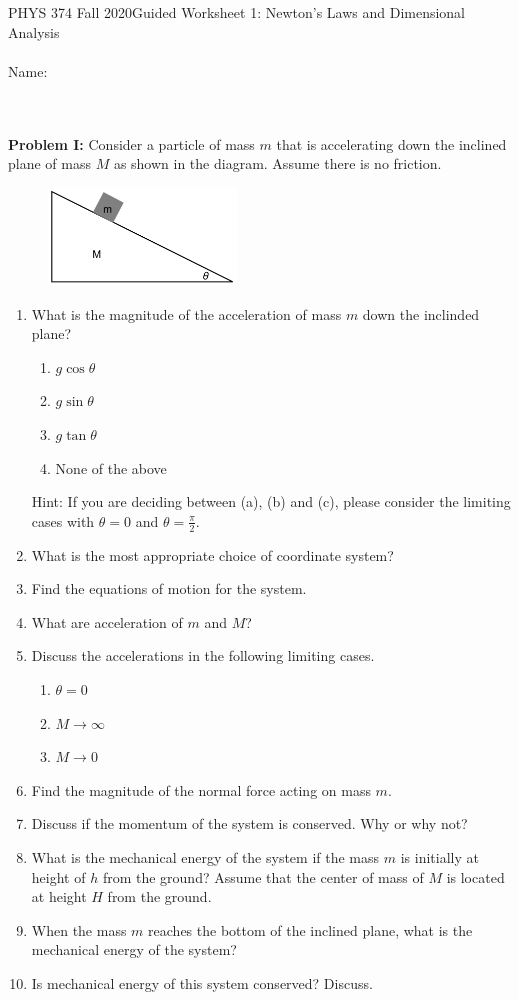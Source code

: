 \documentclass[12pt]{article}
\begin{document}
PHYS 374 Fall 2020\hfill Guided Worksheet 1: Newton's Laws and Dimensional Analysis\\
\\
Name:

\hrulefill
\\
\\
\noindent
\textbf{Problem I: }Consider a particle of mass $m$ that is accelerating down the inclined plane of mass $M$ as shown in the diagram. Assume there is no friction.\\
\begin{figure}[h]
\includegraphics[width=5cm]{Diagram.pdf}
\centering
\end{figure}
\begin{enumerate}
\item What is the magnitude of the acceleration of mass $m$ down the inclinded plane?
    \begin{enumerate}
      \item $g\cos\theta$
      \item $g\sin\theta$
      \item $g\tan\theta$
      \item None of the above
    \end{enumerate}
  Hint: If you are deciding between (a), (b) and (c), please consider the limiting cases with $\theta=0$ and $\theta=\tfrac{\pi}{2}$.  
\item What is the most appropriate choice of coordinate system?
\item Find the equations of motion for the system.
\item What are acceleration of $m$ and $M$?
\item Discuss the accelerations in the following limiting cases.
    \begin{enumerate}
        \item $\theta=0$
        \item $M\rightarrow \infty$
        \item $M\rightarrow 0$
    \end{enumerate}
\item Find the magnitude of the normal force acting on mass $m$.
\item Discuss if the momentum of the system is conserved. Why or why not?
\item What is the mechanical energy of the system if the mass $m$ is initially at height of $h$ from the ground? Assume that the center of mass of $M$ is located at height $H$ from the ground.
\item When the mass $m$ reaches the bottom of the inclined plane, what is the mechanical energy of the system?
\item Is mechanical energy of this system  conserved? Discuss.
\end{enumerate}
\end{document}

